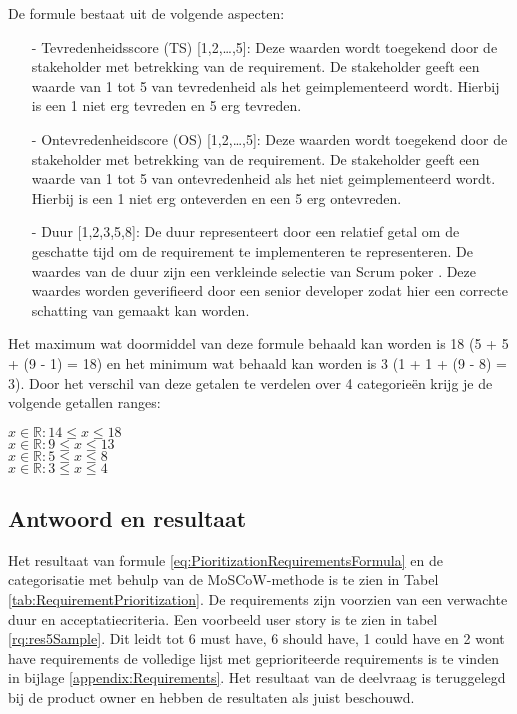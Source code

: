\whitespace
De formule bestaat uit de volgende aspecten:
\begin{enumerate}
	\item[-] Tevredenheidsscore (TS) [1,2,\ldots,5]: Deze waarden wordt toegekend door de stakeholder met betrekking van de requirement.
	      De stakeholder geeft een waarde van 1 tot 5 van tevredenheid als het geimplementeerd wordt.
	      Hierbij is een 1 niet erg tevreden en 5 erg tevreden.
	\item[-] Ontevredenheidscore (OS) [1,2,\dots,5]: Deze waarden wordt toegekend door de stakeholder met betrekking van de requirement.
	      De stakeholder geeft een waarde van 1 tot 5 van ontevredenheid als het niet geimplementeerd wordt.
	      Hierbij is een 1 niet erg onteverden en een 5 erg ontevreden.
	\item[-] Duur [1,2,3,5,8]: De duur representeert door een relatief getal om de geschatte tijd om de requirement te implementeren te representeren.
	      De waardes van de duur zijn een verkleinde selectie van Scrum poker \Parencite{ScrumPoker}.
	      Deze waardes worden geverifieerd door een senior developer zodat hier een correcte schatting van gemaakt kan worden.
\end{enumerate}

\whitespace
Het maximum wat doormiddel van deze formule behaald kan worden is 18 (5 + 5 + (9 - 1) = 18) en het minimum wat behaald kan worden is 3 (1 + 1 + (9 - 8) = 3).
Door het verschil van deze getalen te verdelen over 4 categorieën krijg je de volgende getallen ranges:

\whitespace
{} $ x \in \mathbb{R} : 14 \leq x \leq 18 $ \\
 $ x \in \mathbb{R} : 9 \leq x \leq 13 $ \\
 $ x \in \mathbb{R} :  5 \leq x \leq 8 $ \\
 $ x \in \mathbb{R} : 3 \leq x \leq 4 $

\newpage
\subsection{Antwoord en resultaat}
Het resultaat van formule \ref{eq:PioritizationRequirementsFormula} en de categorisatie met behulp van de MoSCoW-methode is te zien in Tabel \ref{tab:RequirementPrioritization}.
De requirements zijn voorzien van een verwachte duur en acceptatiecriteria.
Een voorbeeld user story is te zien in tabel \ref{rq:res5Sample}.
Dit leidt tot 6 must have, 6 should have, 1 could have en 2 wont have requirements de volledige lijst met geprioriteerde requirements is te vinden in bijlage \ref{appendix:Requirements}.
Het resultaat van de deelvraag is teruggelegd bij de product owner en hebben de resultaten als juist beschouwd.

